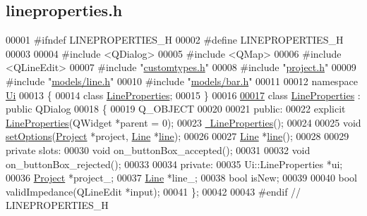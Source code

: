 \hypertarget{lineproperties_8h_source}{}\subsection{lineproperties.\+h}
\label{lineproperties_8h_source}

\begin{DoxyCode}
00001 \textcolor{preprocessor}{#ifndef LINEPROPERTIES\_H}
00002 \textcolor{preprocessor}{#define LINEPROPERTIES\_H}
00003 
00004 \textcolor{preprocessor}{#include <QDialog>}
00005 \textcolor{preprocessor}{#include <QMap>}
00006 \textcolor{preprocessor}{#include <QLineEdit>}
00007 \textcolor{preprocessor}{#include "\hyperlink{customtypes_8h}{customtypes.h}"}
00008 \textcolor{preprocessor}{#include "\hyperlink{project_8h}{project.h}"}
00009 \textcolor{preprocessor}{#include "\hyperlink{line_8h}{models/line.h}"}
00010 \textcolor{preprocessor}{#include "\hyperlink{bar_8h}{models/bar.h}"}
00011 
00012 \textcolor{keyword}{namespace }\hyperlink{namespace_ui}{Ui}
00013 \{
00014 \textcolor{keyword}{class }\hyperlink{class_line_properties}{LineProperties};
00015 \}
00016 
\hypertarget{lineproperties_8h_source_l00017}{}\hyperlink{class_line_properties}{00017} \textcolor{keyword}{class }\hyperlink{class_line_properties}{LineProperties} : \textcolor{keyword}{public} QDialog
00018 \{
00019   Q\_OBJECT
00020 
00021 \textcolor{keyword}{public}:
00022   \textcolor{keyword}{explicit} \hyperlink{class_line_properties_a0bc0d7c02db0a4ea920d040f76679fec}{LineProperties}(QWidget *parent = 0);
00023   \hyperlink{class_line_properties_a59017a6580f2e02dc492522d9267de29}{~LineProperties}();
00024 
00025   \textcolor{keywordtype}{void} \hyperlink{class_line_properties_ad434fc8e65787648a44737fb9f46b475}{setOptions}(\hyperlink{class_project}{Project} *project, \hyperlink{class_line}{Line} *\hyperlink{class_line_properties_ae99691d680b4df7bac3419b5588bd777}{line});
00026 
00027   \hyperlink{class_line}{Line} *\hyperlink{class_line_properties_ae99691d680b4df7bac3419b5588bd777}{line}();
00028 
00029 \textcolor{keyword}{private} slots:
00030   \textcolor{keywordtype}{void} on\_buttonBox\_accepted();
00031 
00032   \textcolor{keywordtype}{void} on\_buttonBox\_rejected();
00033 
00034 \textcolor{keyword}{private}:
00035   Ui::LineProperties *ui;
00036   \hyperlink{class_project}{Project} *project\_;
00037   \hyperlink{class_line}{Line} *line\_;
00038   \textcolor{keywordtype}{bool} isNew;
00039 
00040   \textcolor{keywordtype}{bool} validImpedance(QLineEdit *input);
00041 \};
00042 
00043 \textcolor{preprocessor}{#endif // LINEPROPERTIES\_H}
\end{DoxyCode}

